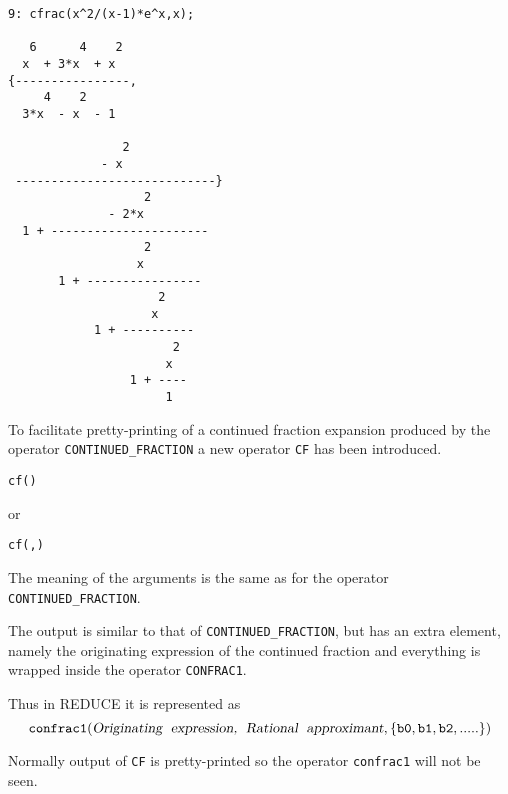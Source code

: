 \begin{verbatim}
9: cfrac(x^2/(x-1)*e^x,x);

   6      4    2
  x  + 3*x  + x
{----------------,
     4    2
  3*x  - x  - 1

                2
             - x
 ----------------------------}
                   2
              - 2*x
  1 + ----------------------
                   2
                  x
       1 + ----------------
                     2
                    x
            1 + ----------
                       2
                      x
                 1 + ----
                      1

\end{verbatim}

\hypertarget{CF:operator}{}

To facilitate pretty-printing of a continued fraction expansion produced
by the operator
\texttt{CONTINUED\_FRACTION} 
a new operator \texttt{CF}  has been
introduced.
\begin{syntaxtable}
    \texttt{cf(}\texttt{)} 
\end{syntaxtable}
or
\begin{syntaxtable}
    \texttt{cf(}\texttt{,}\texttt{)}
\end{syntaxtable}
The meaning of the arguments is the same as for the operator
\texttt{CONTINUED\_FRACTION}.

\hypertarget{CONFRAC1:operator}{}

The output is similar to that of \texttt{CONTINUED\_FRACTION}, but
has an extra element, namely the originating expression of the
continued fraction and everything is wrapped inside the operator
\texttt{CONFRAC1}.

Thus in {\small REDUCE} it is represented as
\[{\tt
  confrac1(\text{\sl Originating\hspace{1mm} expression,\hspace{1mm}
            Rational\hspace{1mm} approximant},
                \{b0, b1, b2,.....\})
}\]

Normally output of \texttt{CF} is pretty-printed so the operator
\texttt{confrac1} will not be seen.

\hypertarget{CF_EXPRESSION:operator}{}
\hypertarget{CF_COEFLIST:operator}{}
\hypertarget{CF_CONVERGENT:operator}{}
\hypertarget{CF_CONVLIST:operator}{}

